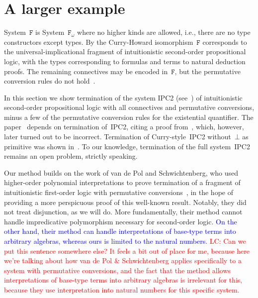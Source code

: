 \documentclass[a4paper,UKenglish,cleveref,autoref,numberwithinsect]{lipics-v2019}
\theoremstyle{definition}
\newcommand{\Fomega}{\mathtt{F}_\omega}
\newcommand{\CKchange}[1]{\textcolor{blue}{#1}}
\newcommand{\LC}[1]{\textcolor{red}{LC: #1}}
\begin{document}
\section{A larger example}\label{sec:examples}

System~$\mathtt{F}$ is System~$\Fomega$ where no higher kinds are
allowed, i.e., there are no type constructors except types. By the
Curry-Howard isomorphism~$\mathtt{F}$ corresponds to the
universal-implicational fragment of intuitionistic second-order
propositional logic, with the types corresponding to formulas and
terms to natural deduction proofs. The remaining connectives may be
encoded in~$\mathtt{F}$, but the permutative conversion rules do not
hold~\cite{Girard1989}.

In this section we show
termination of the system IPC2
(see~\cite{SorensenUrzyczyn2010}) of intuitionistic second-order
propositional logic with all connectives and permutative conversions,
minus a few of the permutative conversion rules for the existential
quantifier. The paper~\cite{SorensenUrzyczyn2010} depends on
termination of~IPC2, citing a proof from~\cite{Wojdyga2008}, which,
however, later turned out to be incorrect. Termination of
Curry-style~IPC2 without~$\bot$ as primitive was shown
in~\cite{Tatsuta2007}. To our knowledge, termination of the full
system~IPC2 remains an open problem, strictly speaking.

\begin{remark}
Our method builds on the work of van de Pol and Schwichtenberg, who used
higher-order polynomial interpretations to prove termination of a
fragment of intuitionistic first-order logic with permutative
conversions~\cite{PolSchwichtenberg1995}, in the hope of providing a
more perspicuous proof of this well-known result. Notably, they did
not treat disjunction, as we will do. More fundamentally, their method
cannot handle impredicative polymorphism necessary for second-order
logic. \CKchange{On the other hand, their method can handle
interpretations of base-type terms into arbitrary algebras, whereas
ours is limited to the natural numbers.}
\LC{Can we put this sentence somewhere else? It feels a bit out of
  place for me, because here we're talking about how van de Pol \&
  Schwichtenberg applies specifically to a system with permutative
  conversions, and the fact that the method allows interpretations of
  base-type terms into arbitrary algebras is irrelevant for this,
  because they use interpretation into natural numbers for this
  specific system.}
\end{remark}
\end{document}
